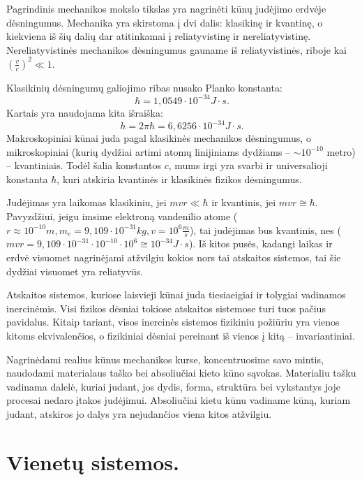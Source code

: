 Pagrindinis mechanikos mokslo tikslas yra nagrinėti kūnų judėjimo
erdvėje dėsningumus. Mechanika yra skirstoma į dvi dalis: klasikinę
ir kvantinę, o kiekviena iš šių dalių dar atitinkamai į reliatyvistinę
ir nereliatyvistinę. Nereliatyvistinės mechanikos dėsningumus gauname
iš reliatyvistinės, riboje kai
$\left( \frac{v}{c} \right)^{2} \ll 1$.

Klasikinių dėsningumų galiojimo ribas nusako Planko konstanta:
\begin{equation}
  \hbar = 1,0549 \cdot 10^{-34} J \cdot s.
  \label{const:hbar}
\end{equation}
Kartais yra naudojama kita išraiška:
\begin{equation}
  h = 2\pi\hbar = 6,6256 \cdot 10^{-34} J \cdot s.
  \label{const:h}
\end{equation}
Makroskopiniai kūnai juda pagal klasikinės mechanikos dėsningumus,
o mikroskopiniai (kurių dydžiai artimi atomų linijiniams dydžiams –
$\sim 10^{-10}$ metro) – kvantiniais. Todėl šalia konstantos $c$, mums
irgi yra svarbi ir universalioji konstanta $\hbar$, kuri atskiria
kvantinės ir klasikinės fizikos dėsningumus.

Judėjimas yra laikomas klasikiniu, jei $mvr \ll \hbar$ ir kvantinis,
jei $mvr \cong \hbar$. Pavyzdžiui, jeigu imsime elektroną vandenilio
atome ($r \approx 10^{-10} m, m_{e} = 9,109 \cdot 10^{-31} kg,
v = 10^{6} \frac{m}{s}$), tai judėjimas bus kvantinis, nes
($mvr = 9,109 \cdot 10^{-31} \cdot 10^{-10} \cdot 10^{6}
\cong 10^{-34} J \cdot s$). Iš kitos pusės, kadangi laikas ir
erdvė visuomet nagrinėjami atžvilgiu kokios nors tai atskaitos sistemos,
tai šie dydžiai visuomet yra reliatyvūs.

Atskaitos sistemos, kuriose laisvieji kūnai juda tiesiaeigiai ir
tolygiai vadinamos inercinėmis. Visi fizikos dėsniai tokiose atskaitos
sistemose turi tuos pačius pavidalus. Kitaip tariant, visos
inercinės sistemos fizikiniu požiūriu yra vienos kitoms ekvivalenčios,
o fizikiniai dėsniai pereinant iš vienos į kitą – invariantiniai.

Nagrinėdami realius kūnus mechanikos kurse, koncentruosime savo mintis,
naudodami materialaus taško bei absoliučiai kieto kūno sąvokas.
Materialiu tašku vadinama dalelė, kuriai judant, jos dydis, forma,
struktūra bei vykstantys joje procesai nedaro įtakos judėjimui.
Absoliučiai kietu kūnu vadiname kūną, kuriam judant, atskiros jo
dalys yra nejudančios viena kitos atžvilgiu.

\section{Vienetų sistemos.}

